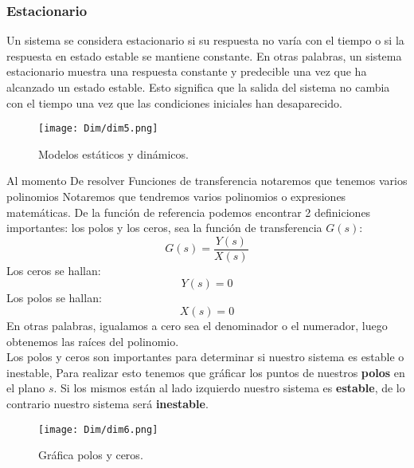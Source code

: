 \documentclass[
	12pt, %
	fleqn, %
	a4paper, %
	oneside, %
]{LegrandOrangeBook}
\begin{document}
\subsubsection{Estacionario}
Un sistema se considera estacionario si su respuesta no varía con el tiempo o si la respuesta en estado estable se mantiene constante. En otras palabras, un sistema estacionario muestra una respuesta constante y predecible una vez que ha alcanzado un estado estable. Esto significa que la salida del sistema no cambia con el tiempo una vez que las condiciones iniciales han desaparecido.
\begin{figure}[H]
\centering
\texttt{[image: Dim/dim5.png]}
\caption{Modelos estáticos y dinámicos.}	
\end{figure}
Al momento De resolver Funciones de transferencia notaremos que tenemos varios polinomios Notaremos que tendremos varios polinomios o expresiones matemáticas. De la función de referencia podemos encontrar 2 definiciones importantes: los polos y los ceros, sea la función de transferencia $G(s)$:
\begin{equation}
G(s)=\frac{Y(s)}{X(s)}
\end{equation}
Los ceros se hallan:
\begin{equation}
Y(s)=0
\end{equation}
Los polos se hallan:
\begin{equation}
X(s)=0
\end{equation}
En otras palabras, igualamos a cero sea el denominador o el numerador, luego obtenemos las raíces del polinomio.\\
Los polos y ceros son importantes para determinar si nuestro sistema es estable o inestable, Para realizar esto tenemos que gráficar los puntos de nuestros \textbf{polos} en el plano $s$. Si los mismos están al lado izquierdo nuestro sistema es \textbf{estable}, de lo contrario nuestro sistema será \textbf{inestable}.
\begin{figure}[H]
 \centering
 \texttt{[image: Dim/dim6.png]}
 \caption{Gráfica polos y ceros.}
 \end{figure} 
\end{document}
